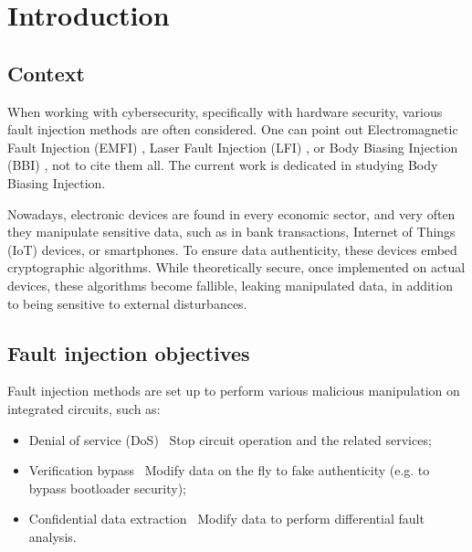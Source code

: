 
\section{Introduction}

\subsection{Context}
	When working with cybersecurity, specifically with hardware security, various fault injection methods are often considered.
	One can point out Electromagnetic Fault Injection (EMFI) \cite{mathieuEMFI}, Laser Fault Injection (LFI) \cite{lfiFaultModel}, or Body Biasing Injection (BBI) \cite{bbiOrigin}, not to cite them all.
	The current work is dedicated in studying Body Biasing Injection.

	Nowadays, electronic devices are found in every economic sector, and very often they manipulate sensitive data, such as in bank transactions, Internet of Things (IoT) devices, or smartphones.
	To ensure data authenticity, these devices embed cryptographic algorithms.
	While theoretically secure, once implemented on actual devices, these algorithms become fallible, leaking manipulated data, in addition to being sensitive to external disturbances.

\subsection{Fault injection objectives}
	Fault injection methods are set up to perform various malicious manipulation on integrated circuits, such as:
	\begin{itemize}
		\item Denial of service (DoS) \textrightarrow\ Stop circuit operation and the related services;
		\item Verification bypass \textrightarrow\ Modify data on the fly to fake authenticity (e.g. to bypass bootloader security);
		\item Confidential data extraction \textrightarrow\ Modify data to perform differential fault analysis.
	\end{itemize}

